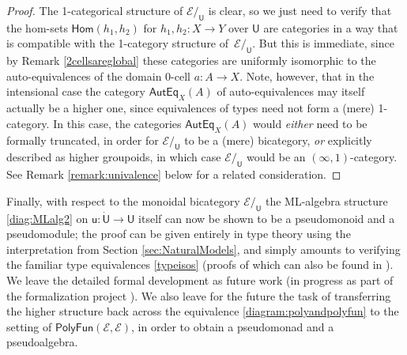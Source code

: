 \documentclass[12pt,reqno]{amsart}
\newcommand{\EE}{\ensuremath{\mathcal{E}}}
\newcommand{\Hom}{\ensuremath{\mathsf{Hom}}}
\renewcommand{\to}{\ensuremath{\rightarrow}}
\renewcommand{\t}{\ensuremath{\mathsf{u}}}
\newcommand{\T}{\ensuremath{\mathsf{U}}}
\newcommand{\TT}{\ensuremath{\dot{\mathsf{U}}}}
\theoremstyle{remark}
\theoremstyle{definition}
\begin{document}
\begin{proof}
The 1-categorical structure of $\EE/_\T$ is clear, so we just need to verify that the hom-sets $\Hom(h_1, h_2)$ for $h_1, h_2 : X \to Y$ over $\T$  are categories in a way that is compatible with the 1-category structure of~$\EE/_\T$.  But this is immediate, since by Remark \ref{2cellsareglobal} these categories are uniformly isomorphic to the auto-equivalences of the domain 0-cell $a: A\to X$.  Note, however, that in the intensional case the category $\mathsf{AutEq}_X(A)$ of auto-equivalences may itself actually be a higher one, since equivalences of types need not form a (mere) 1-category.  In this case, the categories $\mathsf{AutEq}_X(A)$ would \emph{either} need to be formally truncated, in order for $\EE/_\T$ to be a (mere) bicategory, \emph{or} explicitly described as higher groupoids, in which case $\EE/_\T$ would be an $(\infty, 1)$-category.  See Remark \ref{remark:univalence} below for a related consideration.
\end{proof}

Finally, with respect to the monoidal bicategory $\EE/_\T$ the ML-algebra structure \eqref{diag:MLalg2} on $\t : \TT\to\T$ itself can now be shown to be a pseudomonoid and a pseudomodule; the proof can be given entirely in type theory using the interpretation from Section \ref{sec:NaturalModels}, and simply amounts to verifying the familiar type equivalences \eqref{typeisos} (proofs of which can also be found in \cite[Chapter 2]{HoTTbook}).  We leave the detailed formal development as future work (in progress as part of the formalization project \cite{HoTTLean}).  We also leave for the future the task of transferring the higher structure back across the equivalence \eqref{diagram:polyandpolyfun} to the setting of $\mathsf{PolyFun}(\EE, \EE)$, in order to obtain a pseudomonad and a pseudoalgebra.
\end{document}
